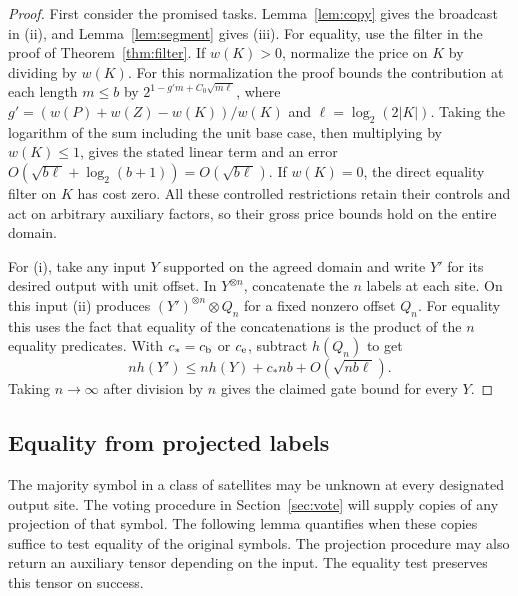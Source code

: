 \begin{proof}
First consider the promised tasks. Lemma~\ref{lem:copy} gives the
broadcast in (ii), and Lemma~\ref{lem:segment} gives (iii).
For equality, use the filter in the proof of Theorem~\ref{thm:filter}.
If \(w(K)>0\), normalize the price on \(K\) by dividing by \(w(K)\).
For this normalization the proof bounds the contribution at each
length \(m\le b\) by
\(2^{1-g'm+C_0\sqrt{m\ell}}\), where
\(g'=(w(P)+w(Z)-w(K))/w(K)\) and \(\ell=\log_2(2|K|)\).
Taking the logarithm of the sum including the unit base case,
then multiplying by \(w(K)\le1\), gives the stated linear term
and an error \(O(\sqrt{b\ell}+\log_2(b+1))=O(\sqrt{b\ell})\).
If \(w(K)=0\), the direct equality filter on \(K\) has cost zero.
All these controlled restrictions retain their controls and act on
arbitrary auxiliary factors, so their gross price bounds hold on the
entire domain.

For (i), take any input \(Y\) supported on the agreed domain and write
\(Y'\) for its desired output with unit offset. In \(Y^{\otimes n}\),
concatenate the \(n\) labels at each site. On this input (ii) produces
\((Y')^{\otimes n}\otimes Q_n\) for a fixed nonzero offset \(Q_n\).
For equality this uses the fact that equality of the concatenations
is the product of the \(n\) equality predicates. With
\(c_*=c_{\rm b}\) or \(c_{\rm e}\), subtract \(h(Q_n)\) to get
\[
              n h(Y')\le n h(Y)+c_*nb+O(\sqrt{nb\ell}).
\]
Taking \(n\to\infty\) after division by \(n\) gives the claimed
gate bound for every \(Y\).
\end{proof}

\subsection{Equality from projected labels}

The majority symbol in a class of satellites may be unknown at every
designated output site. The voting procedure in Section~\ref{sec:vote}
will supply copies of any projection of that symbol. The following
lemma quantifies when these copies suffice to test equality of the
original symbols. The projection procedure may also return an
auxiliary tensor depending on the input. The equality test preserves
this tensor on success.


